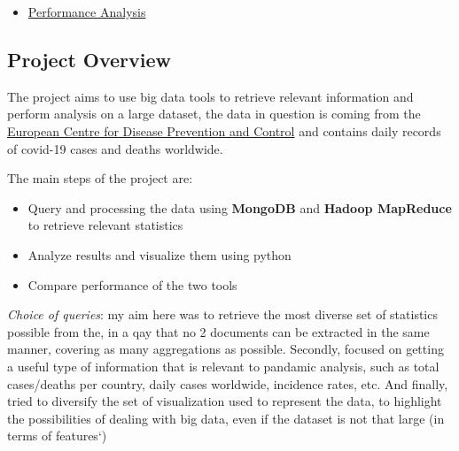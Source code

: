 \documentclass[
]{article}
\providecommand{\tightlist}{%
  \setlength{\itemsep}{0pt}\setlength{\parskip}{0pt}}
\begin{document}
\begin{itemize}
\begin{itemize}
\begin{itemize}
      \begin{itemize}
      \tightlist
      \item
        \protect\hyperlink{31-query-1-continent-stat}{3.1 Query 1:
        continent stat}
      \item
        \protect\hyperlink{32-query-2-country-stats}{3.2 Query 2:
        country stats}
      \item
        \protect\hyperlink{33-query-3-usa-daily-stats-1}{3.3 Query 3:
        USA daily stats}
      \item
        \protect\hyperlink{34-query-4-worldwide-daily-stats-1}{3.4 Query
        4: worldwide daily stats}
      \item
        \protect\hyperlink{35-query-5}{3.5 Query 5:}
      \item
        \protect\hyperlink{36-query-6}{3.6 Query 6:}
      \end{itemize}
    \end{itemize}
  \item
    \protect\hyperlink{performance-analysis}{Performance Analysis}
  \end{itemize}
\end{itemize}

\hypertarget{project-overview}{%
\subsection{Project Overview}\label{project-overview}}

The project aims to use big data tools to retrieve relevant information
and perform analysis on a large dataset, the data in question is coming
from the
\href{https://www.ecdc.europa.eu/en/publications-data/download-todays-data-geographic-distribution-covid-19-cases-worldwide}{European
Centre for Disease Prevention and Control} and contains daily records of
covid-19 cases and deaths worldwide.

The main steps of the project are:

\begin{itemize}
\tightlist
\item
  Query and processing the data using \textbf{MongoDB} and
  \textbf{Hadoop MapReduce} to retrieve relevant statistics
\item
  Analyze results and visualize them using python
\item
  Compare performance of the two tools
\end{itemize}

\emph{Choice of queries}: my aim here was to retrieve the most diverse
set of statistics possible from the, in a qay that no 2 documents can be
extracted in the same manner, covering as many aggregations as possible.
Secondly, focused on getting a useful type of information that is
relevant to pandamic analysis, such as total cases/deaths per country,
daily cases worldwide, incidence rates, etc. And finally, tried to
diversify the set of visualization used to represent the data, to
highlight the possibilities of dealing with big data, even if the
dataset is not that large (in terms of features`)
\end{document}
